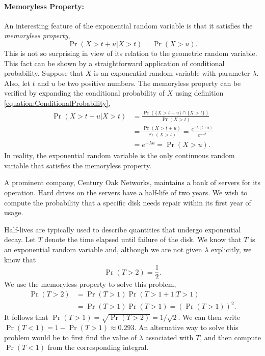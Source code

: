 \paragraph{Memoryless Property:}
An interesting feature of the exponential random variable is that it satisfies the \emph{memoryless property}, 
\begin{equation*}
\Pr (X > t + u | X > t) = \Pr (X > u).
\end{equation*}
This is not so surprising in view of its relation to the geometric random variable.
This fact can be shown by a straightforward application of conditional probability.
Suppose that $X$ is an exponential random variable with parameter $\lambda$.
Also, let $t$ and $u$ be two positive numbers.
The memoryless property can be verified by expanding the conditional probability of $X$ using definition \eqref{equation:ConditionalProbability},
\begin{equation*}
\begin{split}
\Pr (X > t + u | X > t)
&= \frac{\Pr( \{ X > t + u \} \cap \{ X > t \} ) }{ \Pr ( X > t ) } \\
&= \frac{\Pr( X > t + u ) }{ \Pr ( X > t ) }
= \frac{e^{- \lambda (t + u)} }{ e^{- \lambda t } } \\
&= e^{- \lambda u } = \Pr (X > u).
\end{split}
\end{equation*}
In reality, the exponential random variable is the only continuous random variable that satisfies the memoryless property.

\begin{example}
A prominent company, Century Oak Networks, maintains a bank of servers for its operation.
Hard drives on the servers have a half-life of two years.
We wish to compute the probability that a specific disk needs repair within its first year of usage.

Half-lives are typically used to describe quantities that undergo exponential decay.
Let $T$ denote the time elapsed until failure of the disk.
We know that $T$ is an exponential random variable and, although we are not given $\lambda$ explicitly, we know that
\begin{equation*}
\Pr ( T > 2 ) = \frac{1}{2} .
\end{equation*}
We use the memoryless property to solve this problem,
\begin{equation*}
\begin{split}
\Pr (T > 2) &= \Pr (T > 1) \Pr (T > 1 + 1 | T > 1) \\
&= \Pr (T > 1) \Pr (T > 1)
= \left( \Pr(T > 1) \right)^2 .
\end{split}
\end{equation*}
It follows that $\Pr (T > 1) = \sqrt{ \Pr (T > 2) } = 1 / \sqrt{2}$.
We can then write $\Pr (T < 1) = 1 - \Pr (T > 1) \approx 0.293$.
An alternative way to solve this problem would be to first find the value of $\lambda$ associated with $T$, and then compute $\Pr (T < 1)$ from the corresponding integral.
\end{example}


